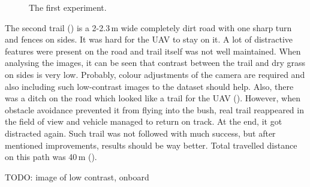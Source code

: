 \begin{figure}[!h]

  \centering

  \centering	
  


  \caption{The first experiment.}
  \label{fig:first_trail_photos}
\end{figure}


The second trail () is a 2-2.3\,m wide completely dirt road with one sharp turn and fences on sides. It was hard for the \acs{UAV} to stay on it. A lot of distractive features were present on the road and trail itself was not well maintained. When analysing the images, it can be seen that contrast between the trail and dry grass on sides is very low. Probably, colour adjustments of the camera are required and also including such low-contrast images to the dataset should help. Also, there was a ditch on the road which looked like a trail for the \acs{UAV} (). However, when obstacle avoidance prevented it from flying into the bush, real trail reappeared in the field of view and vehicle managed to return on track. At the end, it got distracted again. Such trail was not followed with much success, but after mentioned improvements, results should be way better. Total travelled distance on this path was 40\,m ().

TODO: image of low contrast, onboard

